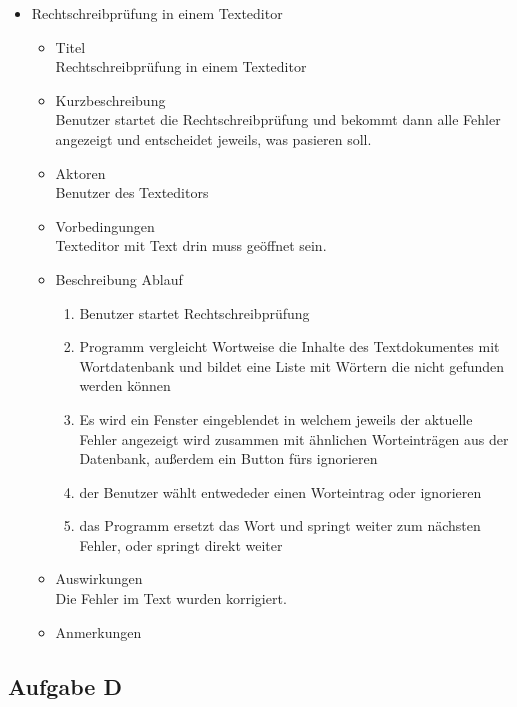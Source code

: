 \documentclass[11pt]{article}
\begin{document}
\begin{itemize}
\item Rechtschreibprüfung in einem Texteditor
\label{sec-2-3-1-2}%
\begin{itemize}

\item Titel\\
\label{sec-2-3-1-2-1}%
Rechtschreibprüfung in einem Texteditor

\item Kurzbeschreibung\\
\label{sec-2-3-1-2-2}%
Benutzer startet die Rechtschreibprüfung und bekommt dann alle
      Fehler angezeigt und entscheidet jeweils, was pasieren soll.

\item Aktoren\\
\label{sec-2-3-1-2-3}%
Benutzer des Texteditors

\item Vorbedingungen\\
\label{sec-2-3-1-2-4}%
Texteditor mit Text drin muss geöffnet sein.

\item Beschreibung Ablauf
\label{sec-2-3-1-2-5}%
\begin{enumerate}
\item Benutzer startet Rechtschreibprüfung
\item Programm vergleicht Wortweise die Inhalte des Textdokumentes mit Wortdatenbank
         und bildet eine Liste mit Wörtern die nicht gefunden werden können
\item Es wird ein Fenster eingeblendet in welchem jeweils der aktuelle Fehler angezeigt wird
         zusammen mit ähnlichen Worteinträgen aus der Datenbank, außerdem ein Button fürs ignorieren
\item der Benutzer wählt entwededer einen Worteintrag oder ignorieren
\item das Programm ersetzt das Wort und springt weiter zum nächsten Fehler, oder springt direkt
         weiter
\end{enumerate}

\item Auswirkungen\\
\label{sec-2-3-1-2-6}%
Die Fehler im Text wurden korrigiert.

\item Anmerkungen
\label{sec-2-3-1-2-7}%
\end{itemize} %
\end{itemize} %
\subsection{Aufgabe D}
\label{sec-2-4}
\end{document}
